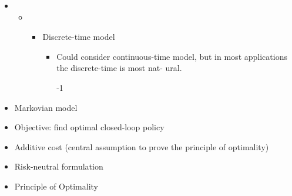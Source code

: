 \documentclass[12pt,twoside]{article}
\begin{document}
\vspace{\baselineskip}
\begin{itemize}
	\item \begin{itemize}
	\item \begin{itemize}
	\item {\fontsize{10pt}{12.0pt}\selectfont Discrete-time model\par}\par

\begin{itemize}
	\item {\fontsize{10pt}{12.0pt}\selectfont Could consider continuous-time model, but in most applications the discrete-time is most nat- ural.\par}\par


\vspace{\baselineskip}
{\fontsize{10pt}{12.0pt}-1\par}\par


\vspace{\baselineskip}

\end{itemize}
\end{itemize}
\end{itemize}
\end{itemize}
\vspace{\baselineskip}
\begin{itemize}
	\item {\fontsize{10pt}{12.0pt}\selectfont Markovian model\par}\par

	\item {\fontsize{10pt}{12.0pt}\selectfont Objective: find optimal closed-loop policy\par}\par

	\item {\fontsize{10pt}{12.0pt}\selectfont Additive cost (central assumption to prove the principle of optimality)\par}\par

	\item {\fontsize{10pt}{12.0pt}\selectfont Risk-neutral formulation\par}\par


\vspace{\baselineskip}
	\item Principle of Optimality
\end{itemize}\par
\end{document}
